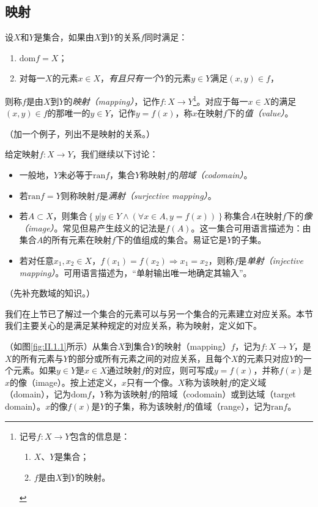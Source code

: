 \documentclass[../main.tex]{subfiles}
\begin{document}
\subsection{映射}

设$X$和$Y$是集合，如果由$X$到$Y$的关系$f$同时满足：
\begin{enumerate}
    \item $\mathrm{dom}f=X$；
    \item 对每一$X$的元素$x\in X$，\emph{有且只有一个}$Y$的元素$y\in Y$满足$\left(x,y\right)\in f$，
\end{enumerate}
则称$f$是由$X$到$Y$的\emph{映射（mapping）}，记作$f:X\rightarrow Y$\footnote{记号$f:X\rightarrow Y$包含的信息是：
    \begin{enumerate}
        \item $X$、$Y$是集合；
        \item $f$是由$X$到$Y$的映射。
    \end{enumerate}
}。对应于每一$x\in X$的满足$\left(x,y\right)\in f$的那唯一的$y\in Y$，记作$y=f\left(x\right)$，称$x$在映射$f$下的\emph{值（value）}。

（加一个例子，列出不是映射的关系。）

给定映射$f:X\rightarrow Y$，我们继续以下讨论：
\begin{itemize}
    \item 一般地，$Y$未必等于$\mathrm{ran}f$，集合$Y$称映射$f$的\emph{陪域（codomain）}。
    \item 若$\mathrm{ran}f=Y$则称映射$f$是\emph{满射（surjective mapping）}。
    \item 若$A\subset X$，则集合$\left\{y|y\in Y\wedge\left(\forall x\in A,y=f\left(x\right)\right)\right\}$称集合$A$在映射$f$下的\emph{像（image）}。常见但易产生歧义的记法是$f\left(A\right)$。这一集合可用语言描述为：由集合$A$的所有元素在映射$f$下的值组成的集合。易证它是$Y$的子集。
    \item 若对任意$x_1,x_2\in X$，$f\left(x_1\right)=f\left(x_2\right)\Rightarrow x_1=x_2$，则称$f$是\emph{单射（injective mapping）}。可用语言描述为，“单射输出唯一地确定其输入”。
\end{itemize}


（先补充数域的知识。）

我们在上节已了解过一个集合的元素可以与另一个集合的元素建立对应关系。本节我们主要关心的是满足某种规定的对应关系，称为映射，定义如下。

\begin{definition}[映射]
    （如图\ref{fig:II.1.1}所示）从集合$X$到集合$Y$的映射（mapping）$f$，记为$f:X\rightarrow Y$，是$X$的所有元素与$Y$的部分或所有元素之间的对应关系，且每个$X$的元素只对应$Y$的一个元素。如果$y\in Y$是$x\in X$通过映射$f$的对应，则可写成$y=f\left(x\right)$，并称$f\left(x\right)$是$x$的像（image）。按上述定义，$x$只有一个像。$X$称为该映射$f$的定义域（domain），记为$\mathrm{dom}f$，$Y$称为该映射$f$的陪域（codomain）或到达域（target domain）。$x$的像$f\left(x\right)$是$Y$的子集，称为该映射$f$的值域（range），记为$\mathrm{ran}f$。
\end{definition}
\end{document}
